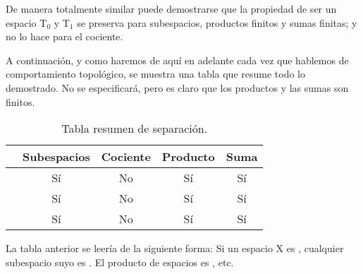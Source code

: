 De manera totalmente similar puede demostrarse que la propiedad de ser un espacio T$_0$ y T$_1$ se preserva para subespacios, productos finitos y sumas finitas; y no lo hace para el cociente.

A continuación, y como haremos de aquí en adelante cada vez que hablemos de comportamiento topológico, se muestra una tabla que resume todo lo demostrado. No se especificará, pero es claro que los productos y las sumas son finitos.

\begin{table}[h]
	\centering
	\begin{tabular}{l|c|c|c|c|}
		\cline{2-5}
		& \multicolumn{1}{l|}{\textbf{Subespacios}} & \multicolumn{1}{l|}{\textbf{Cociente}} & \multicolumn{1}{l|}{\textbf{Producto}} & \multicolumn{1}{l|}{\textbf{Suma}} \\ \hline
		\multicolumn{1}{|l|}{\kolmogorov} & Sí                               & No                            & Sí                            & Sí                        \\ \hline
		\multicolumn{1}{|l|}{\frechet} & Sí                               & No                            & Sí                            & Sí                        \\ \hline
		\multicolumn{1}{|l|}{\hausdorff} & Sí                               & No                            & Sí                            & Sí                        \\ \hline
	\end{tabular}
	\caption{Tabla resumen de separación.}
	\label{Tabla_separacion}
\end{table}
La tabla anterior se leería de la siguiente forma: Si un espacio X es \kolmogorov, cualquier subespacio suyo es \kolmogorov. El producto de espacios \kolmogorov es \kolmogorov, etc.